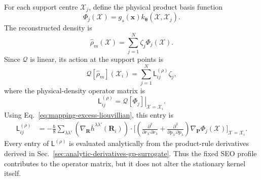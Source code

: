 \documentclass[
  11pt,
  letterpaper,
  onehalfspacing,
  normalmargins,
  equalmargins,
  oneside
]{ut-thesis}
\begin{document}
For each support centre \(\boldsymbol{\mathcal X}_j\), define the physical
product basis function
\begin{equation}
\Phi_j(\boldsymbol{\mathcal X})
=
 g_s(\mathbf x)
 k_{\boldsymbol\theta}
\left(
\boldsymbol{\mathcal X},
\boldsymbol{\mathcal X}_j
\right).
\label{eq:ch5-product-basis-function}
\end{equation}
The reconstructed density is
\begin{equation}
\widehat{\rho}_m(\boldsymbol{\mathcal X})
=
\sum_{j=1}^{N}
\zeta_j\Phi_j(\boldsymbol{\mathcal X}).
\label{eq:ch5-product-expansion}
\end{equation}
Since \(\mathcal Q\) is linear, its action at the support points is
\begin{equation}
\mathcal Q[\widehat{\rho}_m]
\left(\boldsymbol{\mathcal X}_i\right)
=
\sum_{j=1}^{N}
\mathsf L^{(\rho)}_{ij}\zeta_j,
\label{eq:ch5-Q-collocation}
\end{equation}
where the physical-density operator matrix is
\begin{equation}
\mathsf L^{(\rho)}_{ij}
=
\left.
\mathcal Q
\left[
\Phi_j
\right]
\right|_{\boldsymbol{\mathcal X}=\boldsymbol{\mathcal X}_i}.
\label{eq:ch5-physical-operator-matrix}
\end{equation}
Using Eq.~\eqref{eq:mapping-excess-liouvillian}, this entry is
\begin{align}
\mathsf L^{(\rho)}_{ij}
&=
-\frac{\hbar}{8}
\sum_{\lambda\lambda'}
\left(
\nabla_{\mathbf R}
\bar h^{\lambda\lambda'}(\mathbf R_i)
\right)
\cdot
\Bigg[
\left(
\frac{\partial^2}
{\partial r_{\lambda'}\partial r_{\lambda}}
+
\frac{\partial^2}
{\partial p_{\lambda'}\partial p_{\lambda}}
\right)
\nabla_{\mathbf P}
\Phi_j(\boldsymbol{\mathcal X})
\Bigg]_{\boldsymbol{\mathcal X}=\boldsymbol{\mathcal X}_i}.
\label{eq:ch5-physical-operator-matrix-explicit}
\end{align}
Every entry of \(\mathsf L^{(\rho)}\) is evaluated analytically from the product-rule
derivatives derived in
Sec.~\ref{sec:analytic-derivatives-gp-surrogate}. Thus the fixed SEO profile
contributes to the operator matrix, but it does not alter the stationary
kernel itself.
\end{document}
